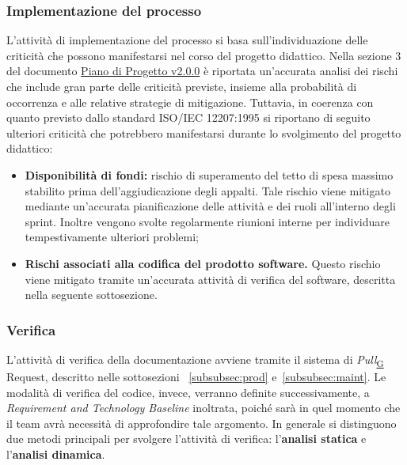 \documentclass[a4paper,12pt]{article}
\begin{document}
        \subsubsection{Implementazione del processo}
            L'attività di implementazione del processo si basa sull'individuazione delle criticità che possono manifestarsi nel corso del progetto didattico.
            Nella sezione 3 del documento \href{https://atlasteam9.github.io/Atlas/docs/PB/documenti/esterni/Piano%20di%20Progetto.pdf}{Piano di Progetto v2.0.0} è riportata un'accurata analisi dei rischi che include gran parte delle criticità previste, insieme alla probabilità di occorrenza e alle relative strategie di mitigazione. Tuttavia, in coerenza con quanto previsto dallo standard ISO/IEC 12207:1995 si riportano di seguito ulteriori criticità che potrebbero manifestarsi durante lo svolgimento del progetto didattico:
            \begin{itemize}
                \item \textbf{Disponibilità di fondi:} rischio di superamento del tetto di spesa massimo stabilito prima dell'aggiudicazione degli appalti. Tale rischio viene mitigato mediante un'accurata pianificazione delle attività e dei ruoli all'interno degli sprint. Inoltre vengono svolte regolarmente riunioni interne per individuare tempestivamente ulteriori problemi;
                \item \textbf{Rischi associati alla codifica del prodotto software.} Questo rischio viene mitigato tramite un'accurata attività di verifica del software, descritta nella seguente sottosezione.
            \end{itemize}    
        

        \subsubsection{Verifica}
            L'attività di verifica della documentazione avviene tramite il sistema di \textit{Pull}\textsubscript{\href{https://atlasteam9.github.io/Atlas/glossario.html\#Pull}{G}} Request, descritto nelle sottosezioni ~\ref{subsubsec:prod} e~\ref{subsubsec:maint}.
            \newline
            Le modalità di verifica del codice, invece, verranno definite successivamente, a \textit{Requirement and Technology Baseline} inoltrata, poiché sarà in quel momento che il team avrà necessità di approfondire tale argomento.
            In generale si distinguono due metodi principali per svolgere l'attività di verifica: l'\textbf{analisi statica} e l'\textbf{analisi dinamica}.
\end{document}
